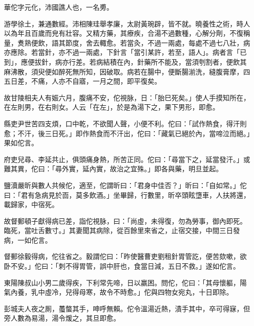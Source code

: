 \begin{pinyinscope}
 
 
 華佗字元化，沛國譙人也，一名旉。
 
 
 游學徐土，兼通數經。沛相陳珪舉孝廉，太尉黃琬辟，皆不就。曉養性之術，時人以為年且百歲而皃有壯容。又精方藥，其療疾，合湯不過數種，心解分劑，不復稱量，煑熟便飲，語其節度，舍去輙愈。若當灸，不過一兩處，每處不過七八壯，病亦應除。若當針，亦不過一兩處，下針言「當引某許，若至，語人」。病者言「已到」，應便拔針，病亦行差。若病結積在內，針藥所不能及，當須刳割者，便飲其麻沸散，須臾便如醉死無所知，因破取。病若在腸中，便斷腸湔洗，縫腹膏摩，四五日差，不痛，人亦不自寤，一月之間，即平復矣。
 
 
 
 
 故甘陵相夫人有娠六月，腹痛不安，佗視脉，日：「胎巳死矣。」使人手摸知所在，在左則男，在右則女。人云「在左」，於是為湯下之，果下男形，即愈。
 
 
 
 
 縣吏尹世苦四支煩，口中乾，不欲聞人聲，小便不利。佗曰：「試作熱食，得汗則愈；不汗，後三日死。」即作熱食而不汗出，佗曰：「藏氣已絕於內，當啼泣而絕。」果如佗言。
 
 
 
 
 府吏兒尋、李延共止，俱頭痛身熱，所苦正同。佗曰：「尋當下之，延當發汗。」或難其異，佗曰：「尋外實，延內實，故治之宜殊。」即各與藥，明旦並起。
 
 
 
 
 鹽瀆嚴昕與數人共候佗，適至，佗謂昕曰：「君身中佳否？」昕曰：「自如常。」佗曰：「君有急病見於靣，莫多飲酒。」坐畢歸，行數里，昕卒頭眩墯車，人扶將還，載歸家，中宿死。
 
 
 
 
 故督郵頓子獻得病已差，詣佗視脉，曰：「尚虛，未得復，勿為勞事，御內即死。臨死，當吐舌數寸。」其妻聞其病除，從百餘里來省之，止宿交接，中間三日發病，一如佗言。
 
 
 
 
 督郵徐毅得病，佗往省之。毅謂佗曰：「昨使醫曹吏劉租針胃管訖，便苦欬嗽，欲卧不安。」佗曰：「刺不得胃管，誤中肝也，食當日減，五日不救。」遂如佗言。
 
 
 
 
 東陽陳叔山小男二歲得疾，下利常先啼，日以羸困。問佗，佗曰：「其母懷軀，陽氣內養，乳中虛冷，兒得母寒，故令不時愈。」佗與四物女宛丸，十日即除。
 
 
 
 
 彭城夫人夜之厠，蠆螫其手，呻呼無賴。佗令溫湯近熱，漬手其中，卒可得寐，但旁人數為易湯，湯令煖之，其旦即愈。
 

\end{pinyinscope}
